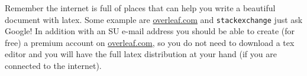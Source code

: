 \documentclass[12pt, a4paper, twoside]{article}
\theoremstyle{definition}
\theoremstyle{plain}
\theoremstyle{remark}
\begin{document}
Remember the internet is full of places that can help you write a beautiful document with latex.
Some example are \url{overleaf.com} and \verb!stackexchange! just ask Google! 
In addition with an SU e-mail address you should be able to 
create (for free) a premium account on \url{overleaf.com}, 
so you do not need to download a tex editor and you will have
the full latex distribution at your hand (if you are connected to the internet).





\clearpage{\thispagestyle{empty}\cleardoublepage}



 
\end{document}
